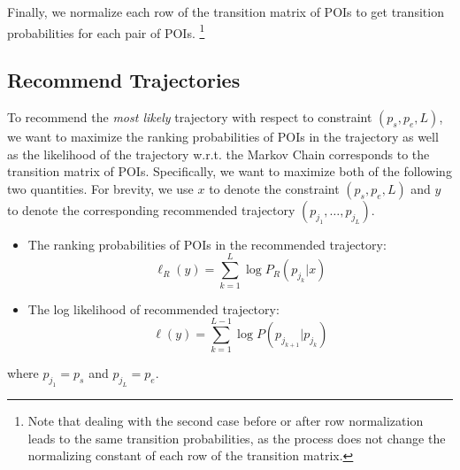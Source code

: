 Finally, we normalize each row of the transition matrix of POIs to get transition probabilities for each pair of POIs.
\footnote{Note that dealing with the second case before or after row normalization leads to the same transition probabilities, 
as the process does not change the normalizing constant of each row of the transition matrix.}


\subsection{Recommend Trajectories}
\label{method:recommend}

To recommend the \textit{most likely} trajectory with respect to constraint $(p_s, p_e, L)$,
we want to maximize the ranking probabilities of POIs in the trajectory as well as
the likelihood of the trajectory w.r.t. the Markov Chain corresponds to the transition matrix of POIs.
Specifically, we want to maximize both of the following two quantities.
For brevity, we use $x$ to denote the constraint $(p_s, p_e, L)$ and $y$ to denote the corresponding
recommended trajectory $(p_{j_1}, \dots, p_{j_L})$.

\begin{itemize}
\item The ranking probabilities of POIs in the recommended trajectory:
      \begin{displaymath}
          \ell_R(y) = \sum_{k=1}^L \log P_R(p_{j_k} | x)
      \end{displaymath}
\item The log likelihood of recommended trajectory:
      \begin{displaymath}
          \ell(y) = \sum_{k=1}^{L-1} \log P(p_{j_{k+1}} | p_{j_k})
      \end{displaymath}
\end{itemize}
where $p_{j_1} = p_s$ and $p_{j_L} = p_e$.

